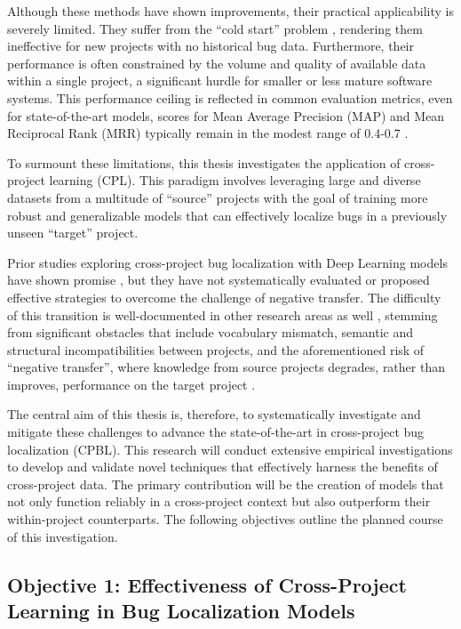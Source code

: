 \documentclass[12pt,table,xcdraw]{article}
\begin{document}
Although these methods have shown improvements, their practical applicability is severely limited. They suffer from the ``cold start'' problem \cite{huo2019deep}, rendering them ineffective for new projects with no historical bug data. Furthermore, their performance is often constrained by the volume and quality of available data within a single project, a significant hurdle for smaller or less mature software systems. This performance ceiling is reflected in common evaluation metrics, even for state-of-the-art models, scores for Mean Average Precision (MAP) and Mean Reciprocal Rank (MRR) typically remain in the modest range of 0.4-0.7 \cite{niu2025deep}.

To surmount these limitations, this thesis investigates the application of cross-project learning (CPL). This paradigm involves leveraging large and diverse datasets from a multitude of ``source'' projects with the goal of training more robust and generalizable models that can effectively localize bugs in a previously unseen ``target'' project.

Prior studies exploring cross-project bug localization with Deep Learning models have shown promise \cite{huo2019deep, zhu2020cooba, liang2022modeling, zhu2022bl}, but they have not systematically evaluated or proposed effective strategies to overcome the challenge of negative transfer. The difficulty of this transition is well-documented in other research areas as well \cite{hosseini2017systematic}, stemming from significant obstacles that include vocabulary mismatch, semantic and structural incompatibilities between projects, and the aforementioned risk of ``negative transfer'', where knowledge from source projects degrades, rather than improves, performance on the target project \cite{huo2019deep}.

The central aim of this thesis is, therefore, to systematically investigate and mitigate these challenges to advance the state-of-the-art in cross-project bug localization (CPBL). This research will conduct extensive empirical investigations to develop and validate novel techniques that effectively harness the benefits of cross-project data. The primary contribution will be the creation of models that not only function reliably in a cross-project context but also outperform their within-project counterparts. The following objectives outline the planned course of this investigation.

\subsection{Objective 1: Effectiveness of Cross-Project Learning in Bug Localization Models}
\label{subsec: obj1}
\end{document}
